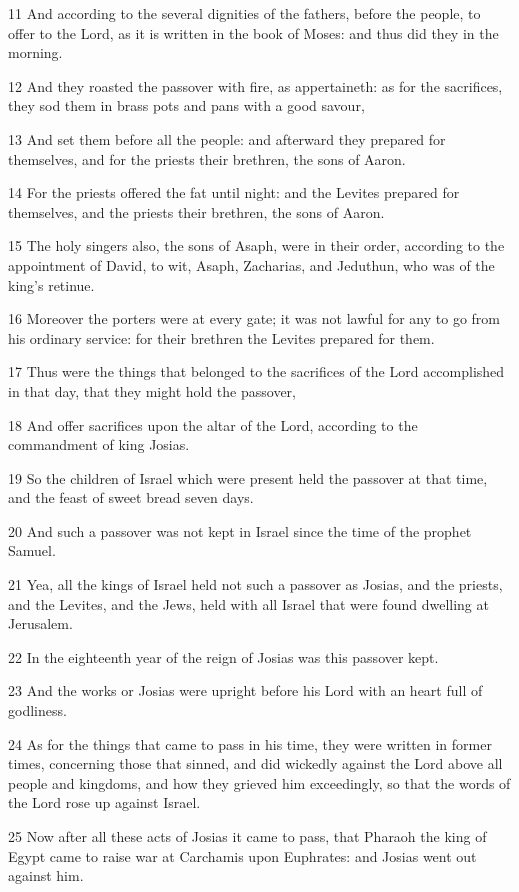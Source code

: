 \par 11 And according to the several dignities of the fathers, before the people, to offer to the Lord, as it is written in the book of Moses: and thus did they in the morning.
\par 12 And they roasted the passover with fire, as appertaineth: as for the sacrifices, they sod them in brass pots and pans with a good savour,
\par 13 And set them before all the people: and afterward they prepared for themselves, and for the priests their brethren, the sons of Aaron.
\par 14 For the priests offered the fat until night: and the Levites prepared for themselves, and the priests their brethren, the sons of Aaron.
\par 15 The holy singers also, the sons of Asaph, were in their order, according to the appointment of David, to wit, Asaph, Zacharias, and Jeduthun, who was of the king's retinue.
\par 16 Moreover the porters were at every gate; it was not lawful for any to go from his ordinary service: for their brethren the Levites prepared for them.
\par 17 Thus were the things that belonged to the sacrifices of the Lord accomplished in that day, that they might hold the passover,
\par 18 And offer sacrifices upon the altar of the Lord, according to the commandment of king Josias.
\par 19 So the children of Israel which were present held the passover at that time, and the feast of sweet bread seven days.
\par 20 And such a passover was not kept in Israel since the time of the prophet Samuel.
\par 21 Yea, all the kings of Israel held not such a passover as Josias, and the priests, and the Levites, and the Jews, held with all Israel that were found dwelling at Jerusalem.
\par 22 In the eighteenth year of the reign of Josias was this passover kept.
\par 23 And the works or Josias were upright before his Lord with an heart full of godliness.
\par 24 As for the things that came to pass in his time, they were written in former times, concerning those that sinned, and did wickedly against the Lord above all people and kingdoms, and how they grieved him exceedingly, so that the words of the Lord rose up against Israel.
\par 25 Now after all these acts of Josias it came to pass, that Pharaoh the king of Egypt came to raise war at Carchamis upon Euphrates: and Josias went out against him.
